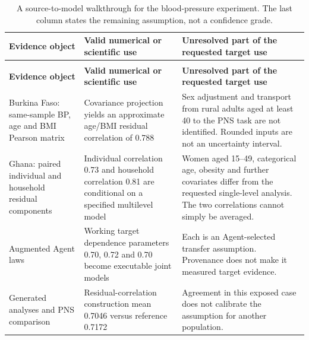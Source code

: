 \documentclass[11pt,letterpaper]{article}
\begin{document}
\FloatBarrier


\FloatBarrier

\begingroup

\small

\renewcommand{\arraystretch}{1.22}

\begin{xltabular}{\linewidth}{@{}>{\raggedright\arraybackslash}X>{\raggedright\arraybackslash}X>{\raggedright\arraybackslash}X@{}}

\caption{A source-to-model walkthrough for the blood-pressure experiment. The last column states the remaining assumption, not a confidence grade.}\label{tab:2} \\

\toprule

\textbf{Evidence object} & \textbf{Valid numerical or scientific use} & \textbf{Unresolved part of the requested target use} \\

\midrule

\endfirsthead

\\

\toprule

\textbf{Evidence object} & \textbf{Valid numerical or scientific use} & \textbf{Unresolved part of the requested target use} \\

\midrule

\endhead

\bottomrule

\endfoot

Burkina Faso: same-sample BP, age and BMI Pearson matrix & Covariance projection yields an approximate age/\allowbreak{}BMI residual correlation of 0.788 & Sex adjustment and transport from rural adults aged at least 40 to the PNS task are not identified. Rounded inputs are not an uncertainty interval. \\

Ghana: paired individual and household residual components & Individual correlation 0.73 and household correlation 0.81 are conditional on a specified multilevel model & Women aged 15–\allowbreak{}49, categorical age, obesity and further covariates differ from the requested single-level analysis. The two correlations cannot simply be averaged. \\

Augmented Agent laws & Working target dependence parameters 0.70, 0.72 and 0.70 become executable joint models & Each is an Agent-selected transfer assumption. Provenance does not make it measured target evidence. \\

Generated analyses and PNS comparison & Residual-correlation construction mean 0.7046 versus reference 0.7172 & Agreement in this exposed case does not calibrate the assumption for another population. \\

\end{xltabular}
\end{document}
